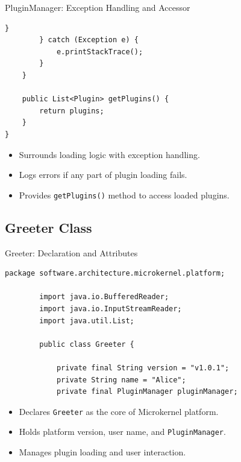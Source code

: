 \documentclass[aspectratio=169, table]{beamer}
\begin{document}
		\begin{frame}[fragile]{\LARGE{PluginManager: Exception Handling and Accessor}}
			\vspace{20pt}
			\begin{lstlisting}[style=JavaStyle, inputencoding=utf8, basicstyle=\scriptsize\ttfamily]
			}
		} catch (Exception e) {
			e.printStackTrace();
		}
	}
	
	public List<Plugin> getPlugins() {
		return plugins;
	}
}
\end{lstlisting}

\begin{itemize}
\item Surrounds loading logic with exception handling.
\item Logs errors if any part of plugin loading fails.
\item Provides \texttt{getPlugins()} method to access loaded plugins.
\end{itemize}
\end{frame}


\subsection{Greeter Class}

\begin{frame}[fragile]{Greeter: Declaration and Attributes}
	\vspace{20pt}
	\begin{lstlisting}[style=JavaStyle, inputencoding=utf8, basicstyle=\scriptsize\ttfamily]
		package software.architecture.microkernel.platform;
		
		import java.io.BufferedReader;
		import java.io.InputStreamReader;
		import java.util.List;
		
		public class Greeter {
			
			private final String version = "v1.0.1";
			private String name = "Alice";
			private final PluginManager pluginManager;
		\end{lstlisting}
		
		\begin{itemize}
			\item Declares \texttt{Greeter} as the core of Microkernel platform.
			\item Holds platform version, user name, and \texttt{PluginManager}.
			\item Manages plugin loading and user interaction.
		\end{itemize}
	\end{frame}
	
\end{document}
